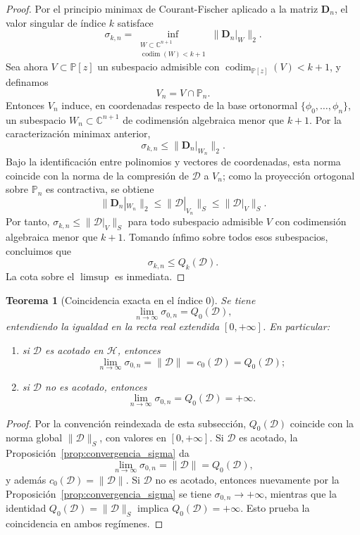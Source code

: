 \documentclass[12pt,a4paper]{article}
\newtheorem{theorem}{Teorema}
\theoremstyle{definition}
\theoremstyle{remark}
\newcommand{\Poly}{\mathbb{P}[z]}
\newcommand{\D}{\mathcal{D}}
\begin{document}
\begin{proof}
  Por el principio minimax de Courant-Fischer aplicado a la matriz $\mathbf{D}_n$, el valor singular de índice $k$ satisface
  \[
    \sigma_{k,n} = \inf_{\substack{W \subset \mathbb{C}^{n+1} \\ \operatorname{codim}(W) < k+1}} \|\mathbf{D}_n|_W\|_2.
  \]
  Sea ahora $V \subset \Poly$ un subespacio admisible con $\operatorname{codim}_{\Poly}(V) < k+1$, y definamos
  \[
    V_n = V \cap \mathbb{P}_{n}.
  \]
  Entonces $V_n$ induce, en coordenadas respecto de la base ortonormal $\{\phi_0,\dots,\phi_{n}\}$, un subespacio $W_n \subset \mathbb{C}^{n+1}$ de codimensión algebraica menor que $k+1$. Por la caracterización minimax anterior,
  \[
    \sigma_{k,n} \le \|\mathbf{D}_n|_{W_n}\|_2.
  \]
  Bajo la identificación entre polinomios y vectores de coordenadas, esta norma coincide con la norma de la compresión de $\D$ a $V_n$; como la proyección ortogonal sobre $\mathbb{P}_{n}$ es contractiva, se obtiene
  \[
    \|\mathbf{D}_n|_{W_n}\|_2 \le \|\D|_{V_n}\|_S \le \|\D|_V\|_S.
  \]
  Por tanto, $\sigma_{k,n} \le \|\D|_V\|_S$ para todo subespacio admisible $V$ con codimensión algebraica menor que $k+1$. Tomando ínfimo sobre todos esos subespacios, concluimos que
  \[
    \sigma_{k,n} \le Q_k(\D).
  \]
  La cota sobre el $\limsup$ es inmediata.
\end{proof}

\begin{theorem}[Coincidencia exacta en el índice $0$]\label{thm:sigma1_q1_extendido}
  Se tiene
  \[
    \lim_{n \to \infty} \sigma_{0,n} = Q_0(\D),
  \]
  entendiendo la igualdad en la recta real extendida $[0,+\infty]$. En particular:
  \begin{enumerate}
    \item si $\D$ es acotado en $\mathcal{H}$, entonces
          \[
            \lim_{n \to \infty} \sigma_{0,n} = \|\D\| = c_0(\D) = Q_0(\D);
          \]
    \item si $\D$ no es acotado, entonces
          \[
            \lim_{n \to \infty} \sigma_{0,n} = Q_0(\D) = +\infty.
          \]
  \end{enumerate}
\end{theorem}

\begin{proof}
  Por la convención reindexada de esta subsección, $Q_0(\D)$ coincide con la norma global $\|\D\|_S$, con valores en $[0,+\infty]$. Si $\D$ es acotado, la Proposición~\ref{prop:convergencia_sigma} da
  \[
    \lim_{n \to \infty} \sigma_{0,n} = \|\D\| = Q_0(\D),
  \]
  y además $c_0(\D) = \|\D\|$. Si $\D$ no es acotado, entonces nuevamente por la Proposición~\ref{prop:convergencia_sigma} se tiene $\sigma_{0,n} \to +\infty$, mientras que la identidad $Q_0(\D) = \|\D\|_S$ implica $Q_0(\D) = +\infty$. Esto prueba la coincidencia en ambos regímenes.
\end{proof}
\end{document}

